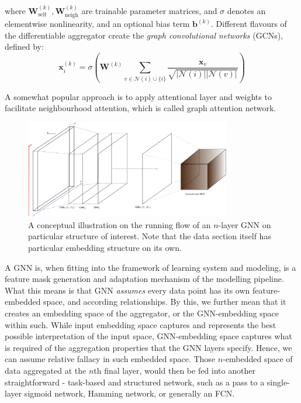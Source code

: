 where $\mathbf{W}_{\mathrm{self}}^{(k)}, \mathbf{W}_{\mathrm{neigh}}^{(k)}$ are trainable parameter matrices, and $\sigma$ denotes an elementwise nonlinearity, and an optional bias term $\mathbf{b}^{(k)}$. Different flavours of the differentiable aggregator create the \textit{graph convolutional networks} (GCNs), defined by: 
\begin{equation}
    \mathbf{x}_i^{(k)} = \sigma \left( \mathbf{W}^{(k)} \sum_{v\in \mathcal{N}(i)\cup \{i\}} \frac{\mathbf{x}_{v}}{\sqrt{\lvert \mathcal{N}(i)\rvert \lvert \mathcal{N}(v)\rvert }} \right)
\end{equation}

A somewhat popular approach is to apply attentional layer and weights to facilitate neighbourhood attention, which is called graph attention network.

\begin{figure}[h!]
    \centering
    \includegraphics[width=0.8\textwidth]{img/What.png}
    \caption{A conceptual illustration on the running flow of an $n$-layer GNN on particular structure of interest. Note that the data section itself has particular embedding structure on its own.}
\end{figure}

A GNN is, when fitting into the framework of learning system and modeling, is a feature mask generation and adaptation mechanism of the modelling pipeline. What this means is that GNN \textit{assumes} every data point has its own feature-embedded space, and according relationships. By this, we further mean that it creates an embedding space of the aggregator, or the GNN-embedding space within such. While input embedding space captures and represents the best possible interpretation of the input space, GNN-embedding space captures what is required of the aggregation properties that the GNN layers specify. Hence, we can assume relative fallacy in such embedded space. Those $n$-embedded space of data aggregated at the $n$th final layer, would then be fed into another straightforward - task-based and structured network, such as a pass to a single-layer sigmoid network, Hamming network, or generally an FCN. 

